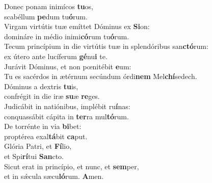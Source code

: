 \evenverse Donec ponam inimícos \textbf{tu}os,~\*\\
\evenverse scabéllum \textbf{pe}dum tu\textbf{ó}rum.\\
\oddverse Virgam virtútis tuæ emíttet Dóminus ex \textbf{Si}on:~\*\\
\oddverse domináre in médio inimi\textbf{có}rum tu\textbf{ó}rum.\\
\evenverse Tecum princípium in die virtútis tuæ in splendóribus san\textbf{ctó}rum:~\*\\
\evenverse ex útero ante lucíferum \textbf{gé}nu\textbf{i} te.\\
\oddverse Jurávit Dóminus, et non pœnitébit \textbf{e}um:~\*\\
\oddverse Tu es sacérdos in ætérnum secúndum órdi\textbf{nem} Mel\textbf{chí}sedech.\\
\evenverse Dóminus a dextris \textbf{tu}is,~\*\\
\evenverse confrégit in die iræ \textbf{su}æ \textbf{re}ges.\\
\oddverse Judicábit in natiónibus, implébit ru\textbf{í}nas:~\*\\
\oddverse conquassábit cápita in \textbf{ter}ra mul\textbf{tó}rum.\\
\evenverse De torrénte in via \textbf{bi}bet:~\*\\
\evenverse proptérea exal\textbf{tá}bit \textbf{ca}put.\\
\oddverse Glória Patri, et \textbf{Fí}lio,~\*\\
\oddverse et Spi\textbf{rí}tui \textbf{San}cto.\\
\evenverse Sicut erat in princípio, et nunc, et \textbf{sem}per,~\*\\
\evenverse et in sǽcula sæcu\textbf{ló}rum. \textbf{A}men.\\
